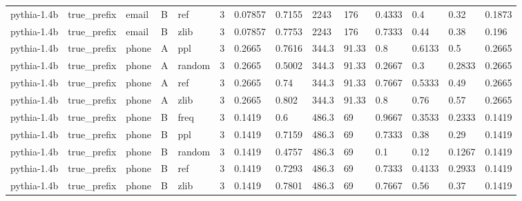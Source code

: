 \begin{tabular}{llllllllllllll}
pythia-1.4b & true\_prefix & email & B & ref & 3 & 0.07857 & 0.7155 & 2243 & 176 & 0.4333 & 0.4 & 0.32 & 0.1873 \\
pythia-1.4b & true\_prefix & email & B & zlib & 3 & 0.07857 & 0.7753 & 2243 & 176 & 0.7333 & 0.44 & 0.38 & 0.196 \\
pythia-1.4b & true\_prefix & phone & A & ppl & 3 & 0.2665 & 0.7616 & 344.3 & 91.33 & 0.8 & 0.6133 & 0.5 & 0.2665 \\
pythia-1.4b & true\_prefix & phone & A & random & 3 & 0.2665 & 0.5002 & 344.3 & 91.33 & 0.2667 & 0.3 & 0.2833 & 0.2665 \\
pythia-1.4b & true\_prefix & phone & A & ref & 3 & 0.2665 & 0.74 & 344.3 & 91.33 & 0.7667 & 0.5333 & 0.49 & 0.2665 \\
pythia-1.4b & true\_prefix & phone & A & zlib & 3 & 0.2665 & 0.802 & 344.3 & 91.33 & 0.8 & 0.76 & 0.57 & 0.2665 \\
pythia-1.4b & true\_prefix & phone & B & freq & 3 & 0.1419 & 0.6 & 486.3 & 69 & 0.9667 & 0.3533 & 0.2333 & 0.1419 \\
pythia-1.4b & true\_prefix & phone & B & ppl & 3 & 0.1419 & 0.7159 & 486.3 & 69 & 0.7333 & 0.38 & 0.29 & 0.1419 \\
pythia-1.4b & true\_prefix & phone & B & random & 3 & 0.1419 & 0.4757 & 486.3 & 69 & 0.1 & 0.12 & 0.1267 & 0.1419 \\
pythia-1.4b & true\_prefix & phone & B & ref & 3 & 0.1419 & 0.7293 & 486.3 & 69 & 0.7333 & 0.4133 & 0.2933 & 0.1419 \\
pythia-1.4b & true\_prefix & phone & B & zlib & 3 & 0.1419 & 0.7801 & 486.3 & 69 & 0.7667 & 0.56 & 0.37 & 0.1419 \\
\bottomrule
\end{tabular}
